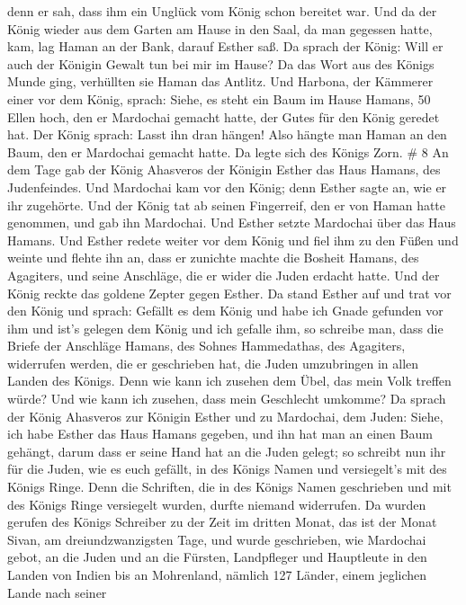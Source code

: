 denn er sah, dass ihm ein Unglück vom König schon bereitet war.
 Und da der König wieder aus dem Garten am Hause in den
Saal, da man gegessen hatte, kam, lag Haman an der Bank, darauf Esther
saß. Da sprach der König: Will er auch der Königin Gewalt tun bei mir im
Hause? Da das Wort aus des Königs Munde ging, verhüllten sie Haman das
Antlitz.  Und Harbona, der Kämmerer einer vor dem König,
sprach: Siehe, es steht ein Baum im Hause Hamans, 50 Ellen hoch, den er
Mardochai gemacht hatte, der Gutes für den König geredet hat. Der König
sprach: Lasst ihn dran hängen!  Also hängte man Haman an
den Baum, den er Mardochai gemacht hatte. Da legte sich des Königs Zorn.
\# 8  An dem Tage gab der König Ahasveros der Königin Esther
das Haus Hamans, des Judenfeindes. Und Mardochai kam vor den König; denn
Esther sagte an, wie er ihr zugehörte.  Und der König tat ab
seinen Fingerreif, den er von Haman hatte genommen, und gab ihn
Mardochai. Und Esther setzte Mardochai über das Haus Hamans.
 Und Esther redete weiter vor dem König und fiel ihm zu den
Füßen und weinte und flehte ihn an, dass er zunichte machte die Bosheit
Hamans, des Agagiters, und seine Anschläge, die er wider die Juden
erdacht hatte.  Und der König reckte das goldene Zepter
gegen Esther. Da stand Esther auf und trat vor den König 
und sprach: Gefällt es dem König und habe ich Gnade gefunden vor ihm und
ist's gelegen dem König und ich gefalle ihm, so schreibe man, dass die
Briefe der Anschläge Hamans, des Sohnes Hammedathas, des Agagiters,
widerrufen werden, die er geschrieben hat, die Juden umzubringen in
allen Landen des Königs.  Denn wie kann ich zusehen dem
Übel, das mein Volk treffen würde? Und wie kann ich zusehen, dass mein
Geschlecht umkomme?  Da sprach der König Ahasveros zur
Königin Esther und zu Mardochai, dem Juden: Siehe, ich habe Esther das
Haus Hamans gegeben, und ihn hat man an einen Baum gehängt, darum dass
er seine Hand hat an die Juden gelegt;  so schreibt nun ihr
für die Juden, wie es euch gefällt, in des Königs Namen und versiegelt's
mit des Königs Ringe. Denn die Schriften, die in des Königs Namen
geschrieben und mit des Königs Ringe versiegelt wurden, durfte niemand
widerrufen.  Da wurden gerufen des Königs Schreiber zu der
Zeit im dritten Monat, das ist der Monat Sivan, am dreiundzwanzigsten
Tage, und wurde geschrieben, wie Mardochai gebot, an die Juden und an
die Fürsten, Landpfleger und Hauptleute in den Landen von Indien bis an
Mohrenland, nämlich 127 Länder, einem jeglichen Lande nach seiner
